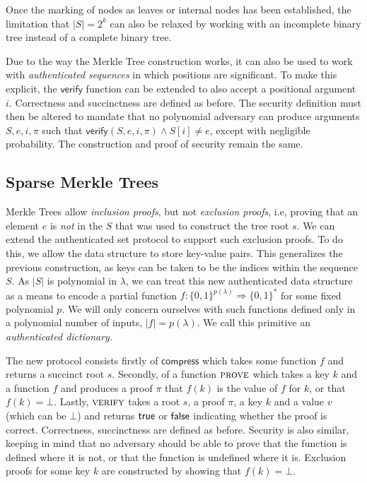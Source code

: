 Once the marking of nodes as leaves or internal nodes
has been established, the limitation that $|S| = 2^k$ can also be relaxed by
working with an incomplete binary tree instead of a complete binary tree.

Due to the way the Merkle Tree construction works, it can also be used to work
with \emph{authenticated sequences} in which positions are significant. To make
this explicit, the $\textsf{verify}$ function can be extended to also accept a
positional argument $i$. Correctness and succinctness are defined as before.
The security definition must then be altered to mandate that no
polynomial adversary can produce arguments $S, e, i, \pi$ such that
$\textsf{verify}(S, e, i, \pi) \land S[i] \neq e$, except with negligible
probability. The construction and proof of security remain the same.

\subsection{Sparse Merkle Trees}
Merkle Trees allow \emph{inclusion proofs}, but not
\emph{exclusion proofs}, i.e, proving that an element $e$ is \emph{not} in
the $S$ that was used to construct the tree root $s$. We can extend the
authenticated set protocol to support such exclusion proofs. To
do this, we allow the data structure to store key-value pairs. This generalizes
the previous construction, as keys can be taken to be the indices within the
sequence $S$. As $|S|$ is polynomial in $\lambda$, we can treat this new
authenticated data structure as a means to encode a partial function
$f: \{0, 1\}^{p(\lambda)} \Rightarrow \{0, 1\}^*$ for some fixed polynomial $p$.
We will only concern ourselves with such functions defined only in a polynomial
number of inputs, $|f| = p(\lambda)$.
We call this primitive an \emph{authenticated dictionary}.

The new protocol consists firstly of $\textsf{compress}$ which takes some function $f$
and returns a succinct root $s$. Secondly, of a function $\textsc{prove}$ which
takes a key $k$ and a function $f$ and produces a proof $\pi$ that $f(k)$ is the
value of $f$ for $k$, or that $f(k) = \bot$. Lastly, $\textsc{verify}$ takes a
root $s$, a proof $\pi$, a key $k$ and a value $v$ (which can be $\bot$) and
returns $\textsf{true}$ or $\textsf{false}$ indicating whether the proof is correct.
Correctness, succinctness are defined as before. Security is also similar,
keeping in mind that no adversary should be able to prove that the function is
defined where it is not, or that the function is undefined where it is.
Exclusion proofs for some key $k$ are constructed by showing that $f(k) = \bot$.

